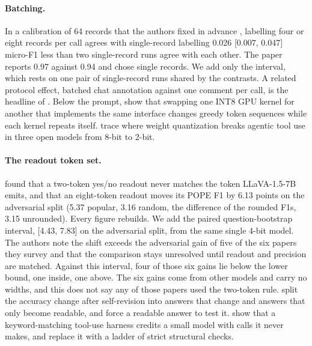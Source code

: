 \documentclass[11pt]{article}
\begin{document}
\paragraph{Batching.} In a calibration of 64 records that the authors fixed in advance \citep{r2610_24999}, labelling four or eight records per
call agrees with single-record labelling 0.026 [0.007, 0.047] micro-F1 less than two single-record runs agree with each other. The paper
reports 0.97 against 0.94 and chose single records. We add only the interval, which rests on one pair of single-record runs shared by the
contrasts. A related protocol effect, batched chat annotation against one comment per call, is the headline of \citep{r2610_15732}.
Below the prompt, \citet{r2609_00363} show that swapping one INT8 GPU kernel for another that implements the same interface changes
greedy token sequences while each kernel repeats itself. \citet{r2609_32042} trace where weight quantization breaks agentic tool use
in three open models from 8-bit to 2-bit.
\paragraph{The readout token set.} \citet{r2610_25964} found that a two-token yes/no readout never matches the token LLaVA-1.5-7B emits, and
that an eight-token readout moves its POPE F1 by 6.13 points on the adversarial split (5.37 popular, 3.16 random, the difference of the rounded F1s, 3.15 unrounded). Every figure rebuilds. We add
the paired question-bootstrap interval, [4.43, 7.83] on the adversarial split, from the same single 4-bit model. The authors note the shift
exceeds the adversarial gain of five of the six papers they survey and that the comparison stays unresolved until readout and precision are
matched. Against this interval, four of those six gains lie below the lower bound, one inside, one above. The six gains come from other
models and carry no widths, and this does not say any of those papers used the two-token rule. \citet{r2608_04355} split the
accuracy change after self-revision into answers that change and answers that only become readable, and force a readable answer to test it.
\citet{r2610_02142} show that a keyword-matching tool-use harness credits a small model with calls it never makes, and replace
it with a ladder of strict structural checks.
\end{document}
